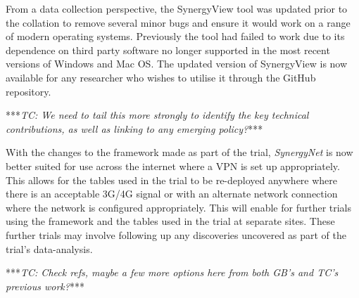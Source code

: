 \documentclass[a4paper,11pt]{article}
\begin{document}
From a data collection perspective, the SynergyView tool was updated prior to the collation to remove several minor bugs and ensure it would work on a range of modern operating systems.
Previously the tool had failed to work due to its dependence on third party software no longer supported in the most recent versions of Windows and Mac OS.
The updated version of SynergyView is now available for any researcher who wishes to utilise it through the GitHub repository.



***{\emph{TC: We need to tail this more strongly to identify the key technical contributions, as well as linking to any emerging policy?}}***

With the changes to the framework made as part of the trial, {\emph{SynergyNet}} is now better suited for use across the internet where a VPN is set up appropriately.
This allows for the tables used in the trial to be re-deployed anywhere where there is an acceptable 3G/4G signal or with an alternate network connection where the network is configured appropriately.
This will enable for further trials using the framework and the tables used in the trial at separate sites.
These further trials may involve following up any discoveries uncovered as part of the trial's data-analysis.

***{\emph{TC: Check refs, maybe a few more options here from both GB's and TC's previous work?}}***



\end{document}
